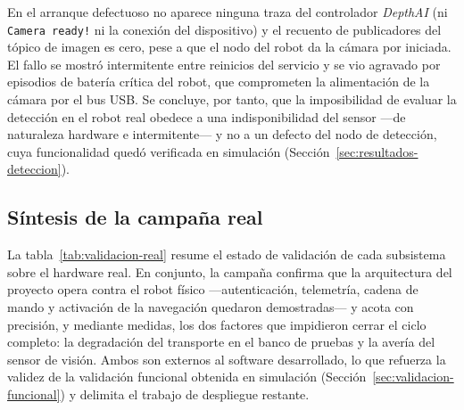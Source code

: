 
En el arranque defectuoso no aparece ninguna traza del controlador \emph{DepthAI} (ni
\texttt{Camera ready!} ni la conexión del dispositivo) y el recuento de publicadores del tópico
de imagen es cero, pese a que el nodo del robot da la cámara por iniciada. El fallo se mostró
intermitente entre reinicios del servicio y se vio agravado por episodios de batería crítica
del robot, que comprometen la alimentación de la cámara por el bus USB. Se concluye, por tanto,
que la imposibilidad de evaluar la detección en el robot real obedece a una indisponibilidad del
sensor —de naturaleza hardware e intermitente— y no a un defecto del nodo de detección, cuya
funcionalidad quedó verificada en simulación (Sección~\ref{sec:resultados-deteccion}).

\subsection{Síntesis de la campaña real}
\label{sec:real-sintesis}

La tabla~\ref{tab:validacion-real} resume el estado de validación de cada subsistema sobre el
hardware real. En conjunto, la campaña confirma que la arquitectura del proyecto opera contra
el robot físico —autenticación, telemetría, cadena de mando y activación de la navegación
quedaron demostradas— y acota con precisión, y mediante medidas, los dos factores que
impidieron cerrar el ciclo completo: la degradación del transporte en el banco de pruebas y la
avería del sensor de visión. Ambos son externos al software desarrollado, lo que refuerza la
validez de la validación funcional obtenida en simulación (Sección~\ref{sec:validacion-funcional})
y delimita el trabajo de despliegue restante.

